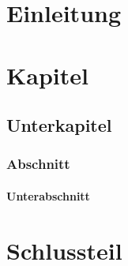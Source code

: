 \chapter{Einleitung}

\chapter{Kapitel}
\section{Unterkapitel}
\subsection{Abschnitt}
\subsubsection{Unterabschnitt}

\chapter{Schlussteil}